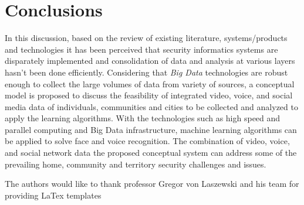 \documentclass[sigconf]{acmart}
\begin{document}
\section{Conclusions}
In this discussion, based on the review of existing literature, systems/products and technologies it has been perceived that security informatics systems are disparately implemented and consolidation of data and analysis at various layers hasn't been done efficiently. Considering that \textit{Big Data} technologies are robust enough to collect the large volumes of data from variety of sources, a conceptual model is proposed to discuss the feasibility of integrated video, voice, and social media data of individuals, communities and cities to be collected and analyzed to apply the learning algorithms. With the technologies such as high speed and parallel computing and Big Data infrastructure, machine learning algorithms can be applied to solve face and voice recognition. The combination of video, voice, and social network data the proposed conceptual system can address some of the prevailing home, community and territory security challenges and issues.

\begin{acks}
The authors would like to thank professor Gregor von Laszewski and his team for providing LaTex templates
\end{acks}


 
\end{document}
